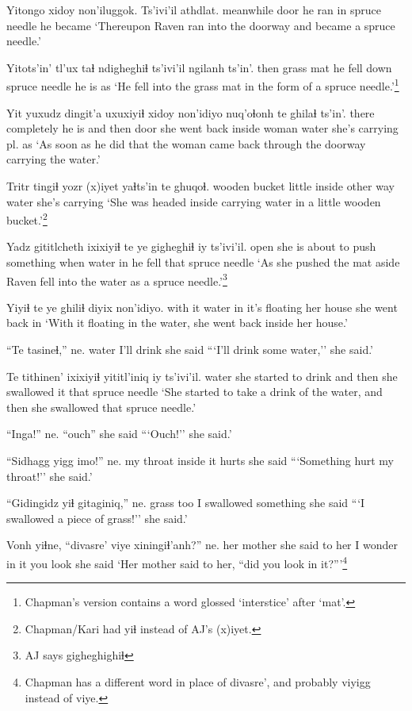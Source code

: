 \documentclass[12pt]{article}
\begin{document}
\gll Yitongo xidoy non'iluggok.  Ts'ivi'il athdlat.
meanwhile door {he ran in} {spruce needle} {he became}
\glt `Thereupon Raven ran into the doorway and became a spruce needle.'
\glend

\gll Yitots'in' tl'ux taɬ ndigheghiɬ ts'ivi'il  ngilanh ts'in'.
then  grass mat {he fell down} {spruce needle} {he is} as
\glt `He fell into the grass mat in the form of a spruce needle.'\footnote{Chapman's version contains a word glossed `interstice' after `mat'.}
\glend

\gll Yit yuxudz dingit'a uxuxiyiɬ xidoy non'idiyo  nuq'oɬonh te ghilaɬ ts'in'.
there completely {he is} {and then} door {she went back inside} woman water {she's carrying pl.} as
\glt `As soon as he did that the woman came back through the doorway carrying the water.'
\glend

\gll Tritr  tingiɬ yozr (x)iyet yaɬts'in te ghuqoɬ.
wooden bucket little inside {other way} water {she's carrying}
\glt `She was headed inside carrying water in a little wooden bucket.'\footnote{Chapman/Kari had yiɬ instead of AJ's (x)iyet.}
\glend

\gll Yadz gititlcheth ixixiyiɬ te ye gigheghiɬ iy ts'ivi'il.
open {she is about to push something} when water in {he fell} that {spruce needle}
\glt `As she pushed the mat aside Raven fell into the water as a spruce needle.'\footnote{AJ says gigheghighiɬ}
\glend

\gll Yiyiɬ  te ye ghiliɬ  diyix  non'idiyo.
{with it} water in {it's floating} {her house} {she went back in}
\glt `With it floating in the water, she went back inside her house.'
\glend

\gll ``Te tasineɬ,'' ne.
water {I'll drink} {she said}
\glt ```I'll drink some water,'' she said.'
\glend

\gll Te tithinen'  ixixiyiɬ  yititl'iniq  iy ts'ivi'il.
water {she started to drink} {and then} {she swallowed it} that {spruce needle}
\glt `She started to take a drink of the water, and then she swallowed that spruce needle.'
\glend

\gll ``Inga!'' ne.
``ouch''  {she said}
\glt ```Ouch!'' she said.'
\glend

\gll ``Sidhagg yigg imo!''  ne.
{my throat} inside {it hurts} {she said}
\glt ```Something hurt my throat!'' she said.'
\glend

\gll ``Gidingidz yiɬ gitaginiq,'' ne.
grass too {I swallowed something} {she said}
\glt ```I swallowed a piece of grass!'' she said.'
\glend

\gll Vonh  yiɬne,  ``divasre' viye xiningiɬ'anh?'' ne.
{her mother} {she said to her} {I wonder} {in it} {you look} {she said}
\glt `Her mother said to her, ``did you look in it?'''\footnote{Chapman has a different word in place of divasre', and probably viyigg instead of viye.}
\glend
\end{document}
